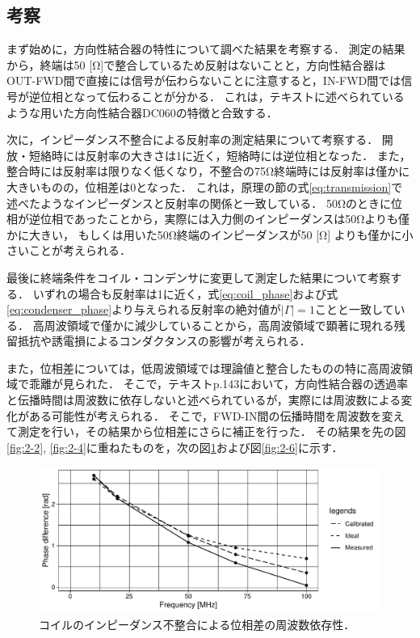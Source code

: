 \documentclass[uplatex,dvipdfmx,a4j,12pt]{jsarticle}
\begin{document}
\subsection{考察}
まず始めに，方向性結合器の特性について調べた結果を考察する．
測定の結果から，終端は50 [\si{\ohm}]で整合しているため反射はないことと，方向性結合器はOUT-FWD間で直接には信号が伝わらないことに注意すると，IN-FWD間では信号が逆位相となって伝わることが分かる．
これは，テキストに述べられているような用いた方向性結合器DC060の特徴と合致する．

次に，インピーダンス不整合による反射率の測定結果について考察する．
開放・短絡時には反射率の大きさは1に近く，短絡時には逆位相となった．
また，整合時には反射率は限りなく低くなり，不整合の75\si{\ohm}終端時には反射率は僅かに大きいものの，位相差は0となった．
これは，原理の節の式\ref{eq:transmission}で述べたようなインピーダンスと反射率の関係と一致している．
50\si{\ohm}のときに位相が逆位相であったことから，実際には入力側のインピーダンスは50\si{\ohm}よりも僅かに大きい，
もしくは用いた50\si{\ohm}終端のインピーダンスが50 [\si{\ohm}] よりも僅かに小さいことが考えられる．

最後に終端条件をコイル・コンデンサに変更して測定した結果について考察する．
いずれの場合も反射率は1に近く，式\ref{eq:coil_phase}および式\ref{eq:condenser_phase}より与えられる反射率の絶対値が$|\Gamma| = 1$ことと一致している．
高周波領域で僅かに減少していることから，高周波領域で顕著に現れる残留抵抗や誘電損によるコンダクタンスの影響が考えられる．

また，位相差については，低周波領域では理論値と整合したものの特に高周波領域で乖離が見られた．
そこで，テキストp.143において，方向性結合器の透過率と伝播時間は周波数に依存しないと述べられているが，実際には周波数による変化がある可能性が考えられる．
そこで，FWD-IN間の伝播時間を周波数を変えて測定を行い，その結果から位相差にさらに補正を行った．
その結果を先の図\ref{fig:2-2}, \ref{fig:2-4}に重ねたものを，次の図\ref{fig:2-5}および図\ref{fig:2-6}に示す．
\begin{figure}[H]
    \centering
    \includegraphics[width=\linewidth]{data/2_1/phase_diff2.pdf}
    \caption{コイルのインピーダンス不整合による位相差の周波数依存性．}
    \label{fig:2-5}
\end{figure}
\end{document}
